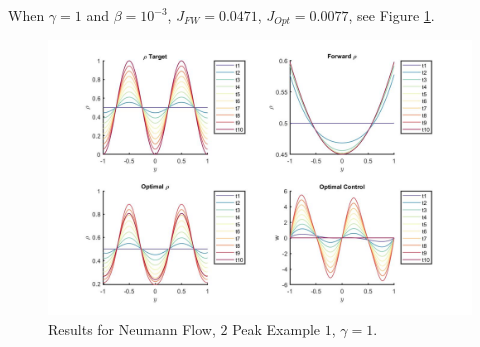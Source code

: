 \documentclass[11pt, a4paper]{article}
\theoremstyle{definition}
\begin{document}
When $\gamma = 1$ and $\beta = 10^{-3}$, $J_{FW} = 0.0471$, $J_{Opt} = 0.0077$, see Figure \ref{Ex12Peak1b}.
\begin{figure}[h]
	\includegraphics[scale=0.3]{Res2Peak1b.jpg}
	\caption{Results for Neumann Flow, $2$ Peak Example $1$, $\gamma = 1$.}
	\label{Ex12Peak1b}
\end{figure}
\end{document}
